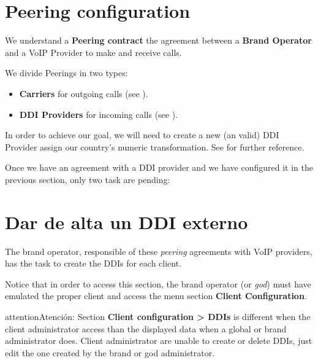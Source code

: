 \documentclass[letterpaper,10pt,spanish]{sphinxmanual}
\begin{document}
\section{Peering configuration}
\label{getting_started/external_incoming_calls/peering:peering-configuration}\label{getting_started/external_incoming_calls/peering::doc}
We understand a \textbf{Peering contract} the agreement between a \textbf{Brand Operator}
and a VoIP Provider to make and receive calls.

We divide Peerings in two types:
\begin{itemize}
\item {} 
\textbf{Carriers} for outgoing calls (see {\hyperref[administration_portal/brand/providers/carriers:carriers]{}}).

\item {} 
\textbf{DDI Providers} for incoming calls (see {\hyperref[administration_portal/brand/providers/ddi_providers:ddi\string-providers]{}}).

\end{itemize}

In order to achieve our goal, we will need to create a new (an valid) DDI Provider assign our country's
numeric transformation. See {\hyperref[administration_portal/brand/providers/ddi_providers:ddi\string-providers]{}} for further reference.

Once we have an agreement with a DDI provider and we have configured it in
the previous section, only two task are pending:


\section{Dar de alta un DDI externo}
\label{getting_started/external_incoming_calls/configure_ddi:settingup-ddi}\label{getting_started/external_incoming_calls/configure_ddi:configuring-an-external-ddi}\label{getting_started/external_incoming_calls/configure_ddi::doc}
The brand operator, responsible of these \emph{peering} agreements with VoIP providers,
has the task to create the DDIs for each client.

Notice that in order to access this section, the brand operator (or \emph{god})
must have emulated the proper client and access the menu section \textbf{Client
Configuration}.

\begin{notice}{attention}{Atención:}
Section \textbf{Client configuration \textgreater{} DDIs} is different when the
client administrator access than the displayed data when a global or brand
administrator does. Client administrator are unable to create or delete
DDIs, just edit the one created by the brand or god administrator.
\end{notice}
\end{document}
